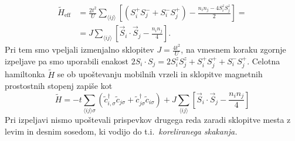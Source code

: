 \begin{appendices}
\begin{equation}\label{eq:mat_elti}
\begin{split}
\tilde{H}_\mathrm{eff}& = \frac{2t^2}{U} \sum\limits_{\langle ij \rangle}\left[ \left( S_i^+S_j^- + S_i^-S_j^+\right) - \frac{n_i n_j - 4S_i^zS_j^z}{2}\right]=\\
&=J\sum\limits_{\langle ij \rangle} \left[ \vec{S}_i\cdot  \vec{S}_j - \frac{n_i n_j}{4}\right].
\end{split}
\end{equation}
Pri tem smo vpeljali izmenjalno sklopitev $J=\frac{4t^2}{U}$, na vmesnem koraku zgornje izpeljave pa smo uporabili enakost $2S_i\cdot S_j = 2S_i^z S_j^z + S_i^+S_j^+ + S_i^-S_j^+$. Celotna hamiltonka $\tilde{H}$ se ob upoštevanju mobilnih vrzeli in sklopitve magnetnih prostostnih stopenj zapiše kot 
\begin{equation}\label{eq:tjhamiltonka}
\tilde{H} = -t\sum\limits_{\langle ij \rangle \sigma} \left(\tilde{c}^\dagger_{i,\sigma} \tilde{c}_{j\sigma} + \tilde{c}^\dagger_{j\sigma}\tilde{c}_{i\sigma}\right) +  J\sum\limits_{\langle ij \rangle} \left[ \vec{S}_i\cdot  \vec{S}_j - \frac{n_i n_j}{4}\right]
\end{equation}
Pri izpeljavi nismo upoštevali prispevkov drugega reda zaradi sklopitve mesta z levim in desnim sosedom, ki vodijo do t.i.~\emph{koreliranega skakanja.}

\end{appendices}
